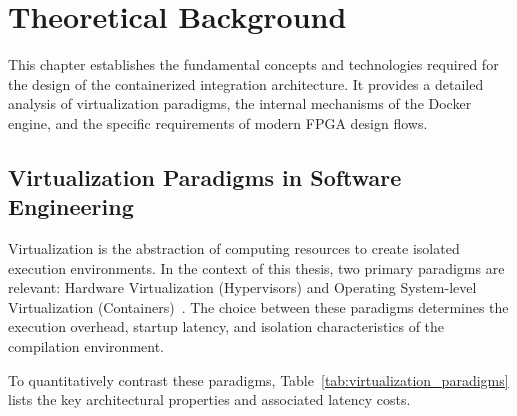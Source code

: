 
\chapter{Theoretical Background}
\label{ch:background}

This chapter establishes the fundamental concepts and technologies required for the design of the containerized integration architecture. It provides a detailed analysis of virtualization paradigms, the internal mechanisms of the Docker engine, and the specific requirements of modern FPGA design flows.

\section{Virtualization Paradigms in Software Engineering}
Virtualization is the abstraction of computing resources to create isolated execution environments. In the context of this thesis, two primary paradigms are relevant: Hardware Virtualization (Hypervisors) and Operating System-level Virtualization (Containers)~\cite{felter2015performance}. The choice between these paradigms determines the execution overhead, startup latency, and isolation characteristics of the compilation environment.

To quantitatively contrast these paradigms, Table~\ref{tab:virtualization_paradigms} lists the key architectural properties and associated latency costs.

